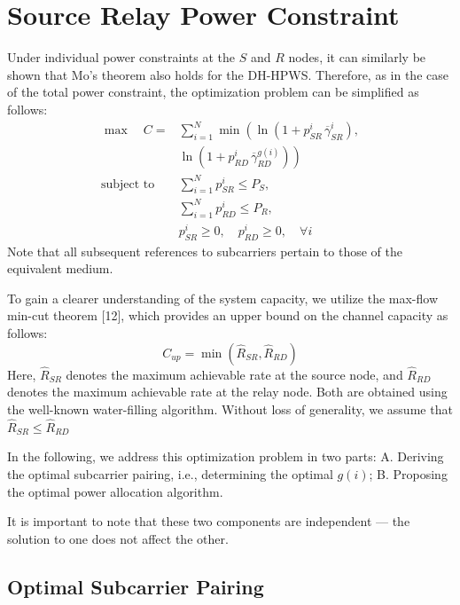 \documentclass[lettersize,journal]{IEEEtran}
\begin{document}
	\section{Source Relay Power Constraint}
	\label{srpc}
	Under individual power constraints at the \(S\) and \(R\) nodes, it can similarly be shown that Mo's theorem also holds for the DH-HPWS. Therefore, as in the case of the total power constraint, the optimization problem can be simplified as follows:
	\begin{equation}
		\begin{aligned}
			\max \quad  C =& \sum_{i=1}^{N} \min \left( \ln\left(1 + p_{SR}^i \, \overline{\gamma}_{SR}^i \right), \right. \\
			& \left. \ln\left(1 + p_{RD}^i \, \overline{\gamma}_{RD}^{g(i)} \right) \right) \\
			\text{subject to} \quad 
			& \sum_{i=1}^{N} p_{SR}^i \leq P_S, \\
			& \sum_{i=1}^{N} p_{RD}^i \leq P_R, \\
			& p_{SR}^i \geq 0, \quad p_{RD}^i \geq 0, \quad \forall i
		\end{aligned}
		\label{eq:separate_power_constraints}
	\end{equation}
	Note that all subsequent references to subcarriers pertain to those of the equivalent medium.
	
	To gain a clearer understanding of the system capacity, we utilize the max-flow min-cut theorem [12], which provides an upper bound on the channel capacity as follows:
	\begin{equation}
		{C_{up}} = \min (\hat {R}_{SR},\hat {R}_{RD})
		\label{eq:15}
	\end{equation}
	Here, \( \hat{R}_{SR} \) denotes the maximum achievable rate at the source node, and \( \hat{R}_{RD} \) denotes the maximum achievable rate at the relay node. Both are obtained using the well-known water-filling algorithm. Without loss of generality, we assume that \( \hat{R}_{SR} \leq \hat{R}_{RD} \)
	
	In the following, we address this optimization problem in two parts:  
	A. Deriving the optimal subcarrier pairing, i.e., determining the optimal \( g(i) \);  
	B. Proposing the optimal power allocation algorithm.  
	  
	It is important to note that these two components are independent — the solution to one does not affect the other.
	
	\subsection{Optimal Subcarrier Pairing}
	
\end{document}
